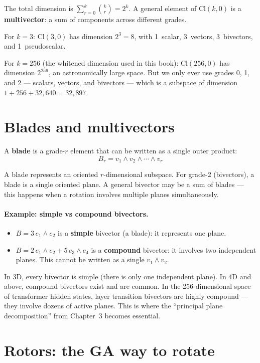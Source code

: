 \documentclass[11pt, twoside, openright]{memoir}
\newcommand{\op}{\wedge}          %
\begin{document}
The total dimension is $\sum_{r=0}^k \binom{k}{r} = 2^k$.  A general
element of $\mathrm{Cl}(k, 0)$ is a \textbf{multivector}: a sum of
components across different grades.

For $k = 3$: $\mathrm{Cl}(3,0)$ has dimension $2^3 = 8$, with
1~scalar, 3~vectors, 3~bivectors, and 1~pseudoscalar.

For $k = 256$ (the whitened dimension used in this book): $\mathrm{Cl}(256, 0)$
has dimension $2^{256}$, an astronomically large space.  But we only
ever use grades 0, 1, and 2 --- scalars, vectors, and bivectors --- which
is a subspace of dimension $1 + 256 + 32{,}640 = 32{,}897$.

\section{Blades and multivectors}

A \textbf{blade} is a grade-$r$ element that can be written as a single
outer product:
\[
  B_r = v_1 \op v_2 \op \cdots \op v_r
\]

A blade represents an oriented $r$-dimensional subspace.  For grade-2
(bivectors), a blade is a single oriented plane.  A general bivector
may be a sum of blades --- this happens when a rotation involves
multiple planes simultaneously.

\paragraph{Example: simple vs compound bivectors.}
\begin{itemize}[nosep]
\item $B = 3 \, e_1 \op e_2$ is a \textbf{simple} bivector (a blade):
  it represents one plane.
\item $B = 2 \, e_1 \op e_2 + 5 \, e_3 \op e_4$ is a \textbf{compound}
  bivector: it involves two independent planes.  This cannot be written
  as a single $v_1 \op v_2$.
\end{itemize}

In 3D, every bivector is simple (there is only one independent plane).
In 4D and above, compound bivectors exist and are common.  In the
256-dimensional space of transformer hidden states, layer transition
bivectors are highly compound --- they involve dozens of active planes.
This is where the ``principal plane decomposition'' from Chapter~3
becomes essential.

\section{Rotors: the GA way to rotate}
\end{document}
